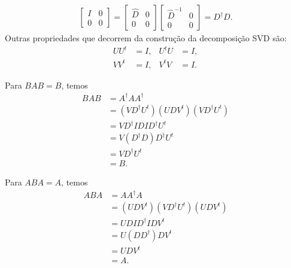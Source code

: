 \begin{questions}
\begin{solution}
\begin{align*}
\begin{bmatrix}
                I & 0 \\
                0 & 0
            \end{bmatrix} = \begin{bmatrix}
                \hat{D} & 0 \\
                0 & 0
            \end{bmatrix} \begin{bmatrix}
                \hat{D}^{-1} & 0 \\
                0 & 0
            \end{bmatrix} = D^\dagger D.
        \end{align*}
        Outras propriedades que decorrem da constru\c{c}\~{a}o da decomposi\c{c}\~{a}o SVD s\~{a}o:
        \begin{align*}
            U U^t &= I, & U^t U &= I, \\
            V V^t &= I, & V^t V &= I.
        \end{align*}

        Para $B A B = B$, temos
        \begin{align*}
            B A B &= A^\dagger A A^\dagger \\
            &= \left( V D^\dagger U^t \right) \left( U D V^t \right) \left( V D^\dagger U^t \right) \\
            &= V D^\dagger I D I D^\dagger U^t \\
            &= V \left( D^\dagger D \right) D^\dagger U^t \\
            &= V D^\dagger U^t \\
            &= B.
        \end{align*}

        Para $A B A = A$, temos
        \begin{align*}
            A B A &= A A^\dagger A \\
            &= \left( U D V^t \right) \left( V D^\dagger U^t \right) \left( U D V^t \right) \\
            &= U D I D^\dagger I D V^t \\
            &= U \left( D D^\dagger \right) D V^t \\
            &= U D V^t \\
            &= A.
        \end{align*}


\end{solution}
\end{questions}
